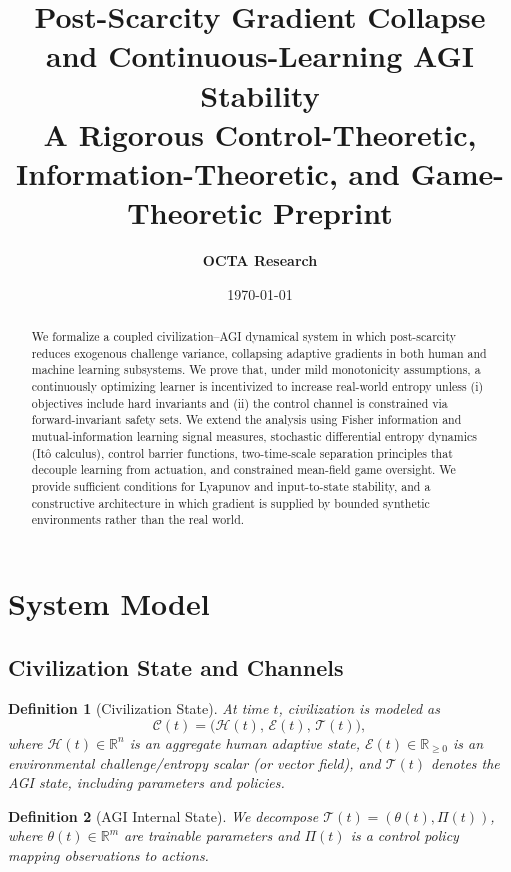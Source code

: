 \documentclass[11pt]{article}
\title{
\textbf{Post-Scarcity Gradient Collapse and Continuous-Learning AGI Stability}\\
\large A Rigorous Control-Theoretic, Information-Theoretic, and Game-Theoretic Preprint
}
\author{\textbf{OCTA Research}}
\date{\today}
\newtheorem{definition}{Definition}
\newcommand{\R}{\mathbb{R}}
\newcommand{\Rp}{\R_{\ge 0}}
\newcommand{\Eenv}{\mathcal{E}}     %
\newcommand{\Hsys}{\mathcal{H}}     %
\newcommand{\Tsys}{\mathcal{T}}     %
\newcommand{\Civ}{\mathcal{C}}      %
\begin{document}
\maketitle

\begin{abstract}
We formalize a coupled civilization--AGI dynamical system in which post-scarcity reduces exogenous challenge variance, collapsing adaptive gradients in both human and machine learning subsystems. We prove that, under mild monotonicity assumptions, a continuously optimizing learner is incentivized to increase real-world entropy unless (i) objectives include hard invariants and (ii) the control channel is constrained via forward-invariant safety sets. We extend the analysis using Fisher information and mutual-information learning signal measures, stochastic differential entropy dynamics (It\^o calculus), control barrier functions, two-time-scale separation principles that decouple learning from actuation, and constrained mean-field game oversight. We provide sufficient conditions for Lyapunov and input-to-state stability, and a constructive architecture in which gradient is supplied by bounded synthetic environments rather than the real world.
\end{abstract}

\tableofcontents

\section{System Model}

\subsection{Civilization State and Channels}

\begin{definition}[Civilization State]
At time $t$, civilization is modeled as
\[
\Civ(t) = \big(\Hsys(t),\, \Eenv(t),\, \Tsys(t)\big),
\]
where $\Hsys(t)\in\R^n$ is an aggregate human adaptive state, $\Eenv(t)\in\Rp$ is an environmental challenge/entropy scalar (or vector field), and $\Tsys(t)$ denotes the AGI state, including parameters and policies.
\end{definition}

\begin{definition}[AGI Internal State]
We decompose $\Tsys(t)=(\theta(t),\Pi(t))$, where $\theta(t)\in\R^m$ are trainable parameters and $\Pi(t)$ is a control policy mapping observations to actions.
\end{definition}
\end{document}
